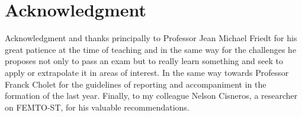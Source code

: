 \documentclass[12pt, twoside]{report}
\begin{document}
\chapter{Acknowledgment}
Acknowledgment and thanks principally to Professor Jean Michael Friedt for his great patience at the time of teaching and in the same way for the challenges he proposes not only to pass an exam but to really learn something and seek to apply or extrapolate it in areas of interest. In the same way towards Professor Franck Cholet for the guidelines of reporting and accompaniment in the formation of the last year. Finally, to my colleague Nelson Cisneros, a researcher on FEMTO-ST, for his valuable recommendations.
\cite{Wang2004}
\cite{Alfano2013}
\cite{Huang1991} 
\cite{Rao2015}
\cite{Yaqoob2005}
\cite{Kishi2016}
\cite{Ali2010}
\cite{Lee2014}
\cite{Izatt2008}
\cite{Hedrick2005}
\cite{Ourak2018}
\cite{Makita2017}
\cite{Cho2007}
\cite{Omar2006}
\cite{Liang2008}
\cite{Magerand2014} 
\cite{Bouma2004}
\cite{Pircher2007}
\cite{Pappuru2012}
\cite{Zawadzki2007}
\cite{Nocedal2006} 
\cite{Sakamoto2008}
\cite{Ricco2009}
\cite{D.Sampson}


\printbibliography
\end{document}

